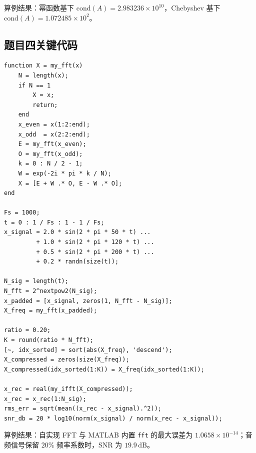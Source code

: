 \documentclass[UTF8,a4paper,11pt]{article}
\begin{document}
算例结果：幂函数基下 $\mathrm{cond}(A)=2.983236\times10^{10}$，Chebyshev 基下 $\mathrm{cond}(A)=1.072485\times10^2$。

\subsection{题目四关键代码}

\begin{lstlisting}[style=matlab, caption={基-2 FFT递归实现与频域压缩核心代码}]
function X = my_fft(x)
    N = length(x);
    if N == 1
        X = x;
        return;
    end
    x_even = x(1:2:end);
    x_odd  = x(2:2:end);
    E = my_fft(x_even);
    O = my_fft(x_odd);
    k = 0 : N / 2 - 1;
    W = exp(-2i * pi * k / N);
    X = [E + W .* O, E - W .* O];
end

Fs = 1000;
t = 0 : 1 / Fs : 1 - 1 / Fs;
x_signal = 2.0 * sin(2 * pi * 50 * t) ...
         + 1.0 * sin(2 * pi * 120 * t) ...
         + 0.5 * sin(2 * pi * 200 * t) ...
         + 0.2 * randn(size(t));

N_sig = length(t);
N_fft = 2^nextpow2(N_sig);
x_padded = [x_signal, zeros(1, N_fft - N_sig)];
X_freq = my_fft(x_padded);

ratio = 0.20;
K = round(ratio * N_fft);
[~, idx_sorted] = sort(abs(X_freq), 'descend');
X_compressed = zeros(size(X_freq));
X_compressed(idx_sorted(1:K)) = X_freq(idx_sorted(1:K));

x_rec = real(my_ifft(X_compressed));
x_rec = x_rec(1:N_sig);
rms_err = sqrt(mean((x_rec - x_signal).^2));
snr_db = 20 * log10(norm(x_signal) / norm(x_rec - x_signal));
\end{lstlisting}

算例结果：自实现 FFT 与 MATLAB 内置 \texttt{fft} 的最大误差为 $1.0658\times10^{-14}$；音频信号保留 $20\%$ 频率系数时，SNR 为 $19.9\,\mathrm{dB}$。
\end{document}
